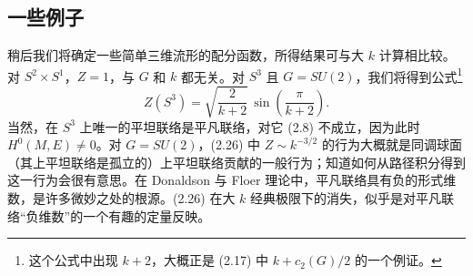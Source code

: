\documentclass[11pt,a4paper]{article}
\begin{document}
\subsection*{一些例子}

稍后我们将确定一些简单三维流形的配分函数，所得结果可与大 $k$ 计算相比较。对 $S^2\times S^1$，$Z=1$，与 $G$ 和 $k$ 都无关。对 $S^3$ 且 $G=SU(2)$，我们将得到公式\footnote{这个公式中出现 $k+2$，大概正是 (2.17) 中 $k+c_2(G)/2$ 的一个例证。}
\begin{equation}
    Z(S^3)=\sqrt{\frac{2}{k+2}}\,\sin\left(\frac{\pi}{k+2}\right).
    \tag{2.26}
\end{equation}
当然，在 $S^3$ 上唯一的平坦联络是平凡联络，对它 (2.8) 不成立，因为此时 $H^0(M,E)\neq0$。对 $G=SU(2)$，(2.26) 中 $Z\sim k^{-3/2}$ 的行为大概就是同调球面（其上平坦联络是孤立的）上平坦联络贡献的一般行为；知道如何从路径积分得到这一行为会很有意思。在 Donaldson 与 Floer 理论中，平凡联络具有负的形式维数，是许多微妙之处的根源。(2.26) 在大 $k$ 经典极限下的消失，似乎是对平凡联络“负维数”的一个有趣的定量反映。


\end{document}
